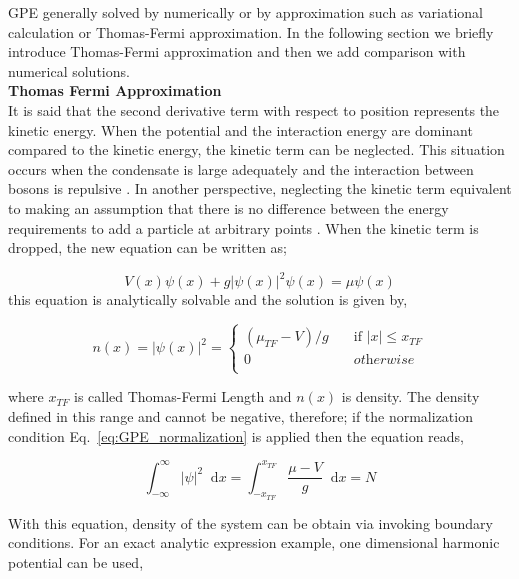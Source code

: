 \documentclass[a4paper,times,hidelinks,12pt]{article}
\newcommand*\dif{\mathop{}\!\mathrm{d}}
\begin{document}
GPE generally solved by numerically or by approximation such as variational calculation or Thomas-Fermi approximation. In the following section we briefly introduce Thomas-Fermi approximation and then we add comparison with numerical solutions. \\

\textbf{Thomas Fermi Approximation}\\


It is said that the second derivative term with respect to position represents the kinetic energy. When the potential and the interaction energy are dominant compared to the kinetic energy, the kinetic term can be neglected. This situation occurs when the condensate is large adequately and the interaction between bosons is repulsive \cite{pethick2002bose}. In another perspective, neglecting the kinetic term equivalent to making an assumption that there is no difference between the energy requirements to add a particle at arbitrary points \cite{rogel2013gross}. When the kinetic term is dropped, the new equation can be written as;

\begin{equation}
\label{eq:GPE_1D_thomas_fermi}
    V(x)\psi(x) + g|\psi(x)|^2\psi(x) = \mu\psi(x)
\end{equation}
\noindent this equation is analytically solvable and the solution is given by,


\begin{equation}
\label{eq:thomas_fermi_solution}    
n(x) = |\psi(x)|^2 =  
    \begin{cases}
        (\mu_{TF} - V)/g &\quad\text{if }  |x| \le x_{TF}  \\
        0 &\quad \textit{otherwise} \\
    \end{cases}
\end{equation}

\noindent where $x_{TF}$ is called Thomas-Fermi Length and $n(x)$ is density. The density defined in this range and cannot be negative, therefore; if the normalization condition Eq.~\eqref{eq:GPE_normalization} is applied then the equation reads,  

\begin{equation}
    \label{eq:thomas_fermi_mu_integral}
        \int_{-\infty}^{\infty} |\psi|^2 \dif x = \int_{-x_{TF}}^{x_{TF}} \frac{\mu - V}{g} \dif x = N 
    \end{equation}

\noindent With this equation, density of the system can be obtain via invoking boundary conditions. For an exact analytic expression example, one dimensional harmonic potential can be used, 
\end{document}
